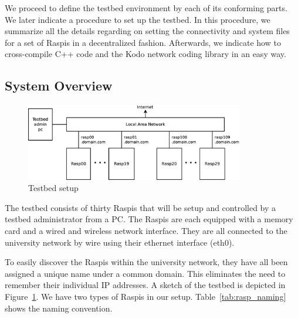\label{sec:testbed}

We proceed to define the testbed environment by each of its conforming
parts. We later indicate a procedure to set up the testbed. In this procedure,
we summarize all the details regarding on setting the connectivity and
system files for a set of \ac{Raspi}s in a decentralized fashion.
Afterwards, we indicate how to cross-compile C++ code and the Kodo
network coding library in an easy way.

\subsection{System Overview}


\begin{figure}[ht!]
\centering
\includegraphics[width=0.85\textwidth]{images/testbed_setup2.eps}
\caption{Testbed setup}
\label{fig:testbed_setup}
\end{figure}

The testbed consists of thirty \ac{Raspi}s that will be setup and controlled
by a testbed administrator from a \ac{PC}.
The \ac{Raspi}s are each equipped with a memory card and a wired and wireless
network interface. They are all connected to the
university network by wire using their ethernet interface (eth0).

To easily discover the \ac{Raspi}s within the university network,
they have all been assigned a unique name under a common domain.
This eliminates the need to remember their individual \ac{IP} addresses.
A sketch of the testbed is depicted in Figure~\ref{fig:testbed_setup}.
We have two types of \ac{Raspi}s in our setup.
Table~\ref{tab:rasp_naming} shows the naming convention.

